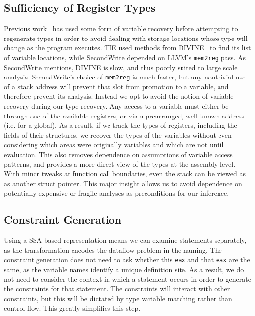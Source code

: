 \subsection{Sufficiency of Register Types}
\label{subsec:regonly}
Previous work~\cite{tie,sw} has used some form of variable recovery before attempting to regenerate types in order to avoid dealing with storage locations whose type will change as the program executes. TIE used methods from DIVINE~\cite{divine} to find its list of variable locations, while SecondWrite depended on LLVM's \texttt{mem2reg} pass. As SecondWrite mentions, DIVINE is slow, and thus poorly suited to large scale analysis. SecondWrite's choice of \texttt{mem2reg} is much faster, but any nontrivial use of a stack address will prevent that slot from promotion to a variable, and therefore prevent its analysis. Instead we opt to avoid the notion of variable recovery during our type recovery. Any access to a variable must either be through one of the available registers, or via a prearranged, well-known address (i.e. for a global). As a result, if we track the types of registers, including the fields of their structures, we recover the types of the variables without even considering which areas were originally variables and which are not until evaluation. This also removes dependence on assumptions of variable access patterns, and provides a more direct view of the types at the assembly level. With  minor tweaks at function call boundaries, even the stack can be viewed as as another struct pointer. This major insight allows us to avoid dependence on potentially expensive or fragile analyses as preconditions for our inference.

\subsection{Constraint Generation}
Using a SSA-based representation means we can examine statements separately, as the transformation encodes the dataflow problem in the naming. The constraint generation does not need to ask whether this \texttt{eax} and that \texttt{eax} are the same, as the variable names identify a unique definition site. As a result, we do not need to consider the context in which a statement occurs in order to generate the constraints for that statement. The constraints will interact with other constraints, but this will be dictated by type variable matching rather than control flow. This greatly simplifies this step.

